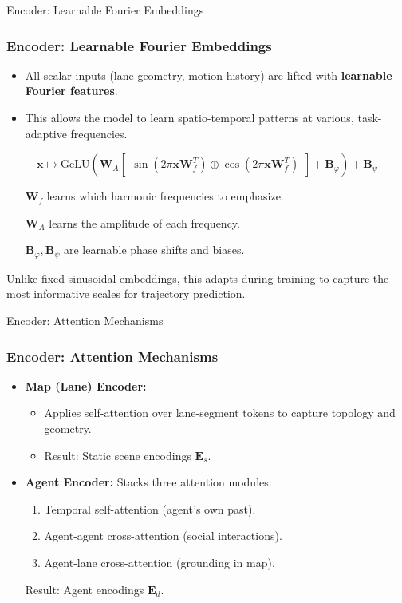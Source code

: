 \documentclass[10pt,aspectratio=169]{beamer}
\begin{document}
\begin{frame}{Encoder: Learnable Fourier Embeddings}
    \frametitle{Encoder: Learnable Fourier Embeddings}
    \begin{itemize}
        \item All scalar inputs (lane geometry, motion history) are lifted with \textbf{learnable Fourier features}.
        \item This allows the model to learn spatio-temporal patterns at various, task-adaptive frequencies.
    \end{itemize}
    \begin{equation}
      \label{eq:pres_learnable_fourier_embedding}
    \mathbf{x} \mapsto \text{GeLU}\left(\mathbf{W}_A \begin{bmatrix} \sin(2\pi \mathbf{x} \mathbf{W}_f^T) \oplus \cos(2\pi \mathbf{x} \mathbf{W}_f^T) \end{bmatrix} + \mathbf{B}_\varphi\right) + \mathbf{B}_\psi
    \end{equation}
    \begin{itemize}
        \item[\(\mathbf{W}_f\)] learns which harmonic frequencies to emphasize.
        \item[\(\mathbf{W}_A\)] learns the amplitude of each frequency.
        \item[\(\mathbf{B}_\varphi, \mathbf{B}_\psi\)] are learnable phase shifts and biases.
    \end{itemize}
    \vspace{1em}
    \small{Unlike fixed sinusoidal embeddings, this adapts during training to capture the most informative scales for trajectory prediction.}
\end{frame}

\begin{frame}{Encoder: Attention Mechanisms}
    \frametitle{Encoder: Attention Mechanisms}
    \begin{itemize}
        \item<1-> \textbf{Map (Lane) Encoder:}
              \begin{itemize}
                \item Applies self-attention over lane-segment tokens to capture topology and geometry.
                \item Result: Static scene encodings \(\mathbf{E}_s\).
              \end{itemize}
        \item<2-> \textbf{Agent Encoder:} Stacks three attention modules:
              \begin{enumerate}
                \item Temporal self-attention (agent's own past).
                \item Agent-agent cross-attention (social interactions).
                \item Agent-lane cross-attention (grounding in map).
              \end{enumerate}
              Result: Agent encodings \(\mathbf{E}_d\).
    \end{itemize}
\end{frame}
\end{document}
